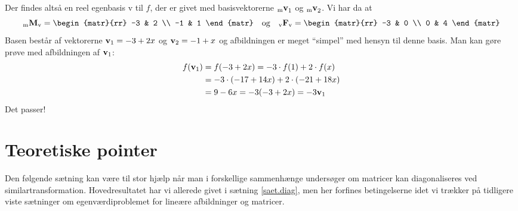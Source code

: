 \begin{example}
Der findes altså en reel egenbasis v til $ f $, der er givet med basisvektorerne $ {_\mathrm{m}\mathbf{v}}_1 $ og $ {_\mathrm{m}\mathbf{v}}_2 $. Vi har da at
\begin{equation}
\matind mMv = \begin{matr}{rr} -3 & 2 \\ -1 & 1 \end{matr} \quad \mathrm{og} \quad \matind vFv = \begin{matr}{rr} -3 & 0 \\ 0 & 4 \end{matr}
\end{equation}
Basen består af vektorerne $ \mathbf{v}_1 = -3 + 2x $ og $ \mathbf{v}_2 = -1 + x $ og afbildningen er meget ``simpel'' med hensyn til denne basis. \bs
Man kan gøre prøve med afbildningen af $ \mathbf{v}_1 $:
\begin{equation}
\begin{aligned}
f(\mathbf{v}_1) &= f(-3 + 2x) = -3 \cdot f(1) + 2 \cdot f(x) \\
&= -3 \cdot (-17 + 14x) +2 \cdot (-21 + 18x) \\
&= 9-6x = -3(-3+2x) = -3\mathbf{v}_1
\end{aligned}
\end{equation}
Det passer!
\end{example}

\section{Teoretiske pointer}

Den følgende sætning kan være til stor hjælp når man i forskellige sammenhænge undersøger om matricer kan diagonaliseres ved similartransformation. Hovedresultatet har vi allerede givet i sætning \ref{saet.diag}, men her  forfines betingelserne idet vi trækker på tidligere viste sætninger om egenværdiproblemet for lineære afbildninger og matricer.

